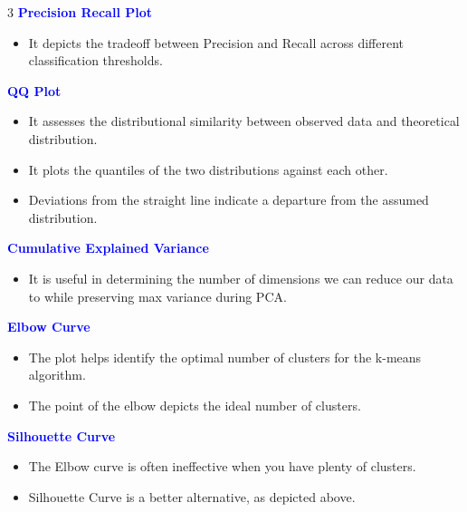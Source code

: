 \documentclass[letterpaper, 10.5pt,landscape]{article}
\begin{document}
\begin{multicols*}{3}
\textbf{\textcolor{blue}{Precision Recall Plot}}
\vspace{-2pt}
\begin{itemize}[leftmargin=4mm]
    \item It depicts the tradeoff between Precision and Recall across different classification thresholds.
\end{itemize}


\textbf{\textcolor{blue}{QQ Plot}}
\vspace{-2pt}
\begin{itemize}[leftmargin=4mm]
    \item It assesses the distributional similarity between observed data and theoretical distribution.
    \vspace{-2pt}
    \item It plots the quantiles of the two distributions against each other.
    \item Deviations from the straight line indicate a departure from the assumed distribution.
\end{itemize}


\textbf{\textcolor{blue}{Cumulative Explained Variance}}
\vspace{-2pt}
\begin{itemize}[leftmargin=4mm]
    \item It is useful in determining the number of dimensions we can reduce our data to while preserving max variance during PCA.
\end{itemize}




\textbf{\textcolor{blue}{Elbow Curve}}
\vspace{-2pt}
\begin{itemize}[leftmargin=4mm]
    \item The plot helps identify the optimal number of clusters for the k-means algorithm.
    \vspace{-2pt}
    \item The point of the elbow depicts the ideal number of clusters.
\end{itemize}



\textbf{\textcolor{blue}{Silhouette Curve}}
\vspace{-2pt}
\begin{itemize}[leftmargin=4mm]
    \item The Elbow curve is often ineffective when you have plenty of clusters.
    \vspace{-2pt}
    \item Silhouette Curve is a better alternative, as depicted above.
\end{itemize}





\end{multicols*}
\end{document}
